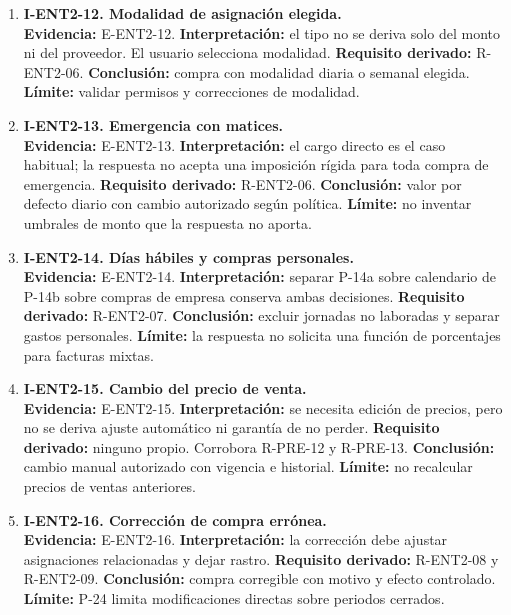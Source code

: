 {\begin{enumerate}
  \item \textbf{I-ENT2-12. Modalidad de asignación elegida.}\\
  \textbf{Evidencia:} E-ENT2-12. \textbf{Interpretación:} el tipo no se
  deriva solo del monto ni del proveedor. El usuario selecciona modalidad.
  \textbf{Requisito derivado:} R-ENT2-06. \textbf{Conclusión:} compra con
  modalidad diaria o semanal elegida. \textbf{Límite:} validar permisos y
  correcciones de modalidad.

  \item \textbf{I-ENT2-13. Emergencia con matices.}\\
  \textbf{Evidencia:} E-ENT2-13. \textbf{Interpretación:} el cargo directo
  es el caso habitual; la respuesta no acepta una imposición rígida para
  toda compra de emergencia. \textbf{Requisito derivado:} R-ENT2-06.
  \textbf{Conclusión:} valor por defecto diario con cambio autorizado según
  política. \textbf{Límite:} no inventar umbrales de monto que la respuesta
  no aporta.

  \item \textbf{I-ENT2-14. Días hábiles y compras personales.}\\
  \textbf{Evidencia:} E-ENT2-14. \textbf{Interpretación:} separar P-14a
  sobre calendario de P-14b sobre compras de empresa conserva ambas
  decisiones. \textbf{Requisito derivado:} R-ENT2-07. \textbf{Conclusión:}
  excluir jornadas no laboradas y separar gastos personales. \textbf{Límite:}
  la respuesta no solicita una función de porcentajes para facturas mixtas.

  \item \textbf{I-ENT2-15. Cambio del precio de venta.}\\
  \textbf{Evidencia:} E-ENT2-15. \textbf{Interpretación:} se necesita
  edición de precios, pero no se deriva ajuste automático ni garantía de no
  perder. \textbf{Requisito derivado:} ninguno propio. Corrobora R-PRE-12 y
  R-PRE-13. \textbf{Conclusión:} cambio manual autorizado con vigencia e
  historial. \textbf{Límite:} no recalcular precios de ventas anteriores.

  \item \textbf{I-ENT2-16. Corrección de compra errónea.}\\
  \textbf{Evidencia:} E-ENT2-16. \textbf{Interpretación:} la corrección debe
  ajustar asignaciones relacionadas y dejar rastro. \textbf{Requisito
  derivado:} R-ENT2-08 y R-ENT2-09. \textbf{Conclusión:} compra corregible
  con motivo y efecto controlado. \textbf{Límite:} P-24 limita
  modificaciones directas sobre periodos cerrados.


\end{enumerate}}
